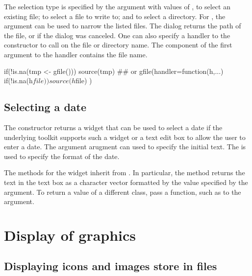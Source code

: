 The selection type is specified by the  argument with
values of , to select an existing file;  to select a file
to write to; and  to select a directory. For
, the  argument can be used to
narrow the listed files. The dialog returns the path of the file, or  if the dialog was canceled. One can also
specify a handler to the constructor to call on the file or directory
name. The component  of the first argument to the handler
contains the file name.

\begin{Schunk}
\begin{Sinput}
 if(!is.na(tmp <- gfile())) 
   source(tmp)
 ## or
 gfile(handler=function(h,...) {
   if(!is.na(h$file))
     source(h$file) 
 })   
\end{Sinput}
\end{Schunk}


\subsection{Selecting a date}
\label{sec:gWidgets-selecting-date}

The  constructor returns a widget that can be
used to select a date if the underlying toolkit supports such a widget
or a text edit box to allow the user to enter a date. The argument
 arugment can used to specify the initial
text. The  is used to specify the format of the date.

The methods for the widget inherit from . In particular,
the  method returns the text in the text box
as a character vector formatted by the value specified by the
 argument. To return a value of a
different class, pass a function, such as  to the
 argument.


\section{Display of graphics}
\label{sec:gWidgets-display-grapics}

\subsection{Displaying icons and images store in files}
\label{sec:gWidgets-displ-icons-imag}

